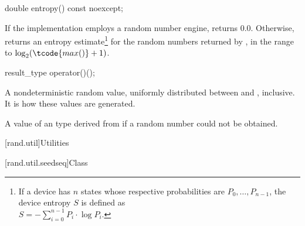 %
\begin{itemdecl}
double entropy() const noexcept;
\end{itemdecl}

\begin{itemdescr}
\pnum\returns If the implementation employs a random number engine,
 returns $0.0$.
 Otherwise, returns an entropy estimate\footnote{If a device has $n$ states
   whose respective probabilities are
   $P_0, \dotsc, P_{n-1}$,
   the device entropy $S$ is defined as\\
   $S = - \sum_{i=0}^{n-1} P_i \cdot \log P_i$.}
 for the random numbers returned by ,
 in the range
 to
   $\log_2( \tcode{max()}+1)$.
\end{itemdescr}

%
\begin{itemdecl}
result_type operator()();
\end{itemdecl}

\begin{itemdescr}
\pnum\returns A nondeterministic random value,
 uniformly distributed
 between  and ,
 inclusive.
 It is 
 how these values are generated.

\pnum
\throws A value of an 
 type derived from 
 if a random number could not be obtained.
\end{itemdescr}




[rand.util]{Utilities}%
%


[rand.util.seedseq]{Class }%

